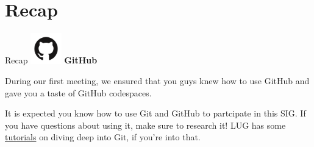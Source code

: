 \documentclass{beamer}
\begin{document}
	\section*{Recap}
	\begin{frame}{Recap}
	\includegraphics[width=0.1\textwidth]{github.png} \textbf{GitHub}

During our first meeting, we ensured that you guys knew how to use GitHub and gave you a taste of GitHub codespaces.

		It is expected you know how to use Git and GitHub to partcipate in this SIG. If you have questions about using it, make sure to research it! LUG has some \href{https://lug.cs.uic.edu/git2.html}{tutorials} on diving deep into Git, if you're into that.

	\end{frame}
\end{document}
